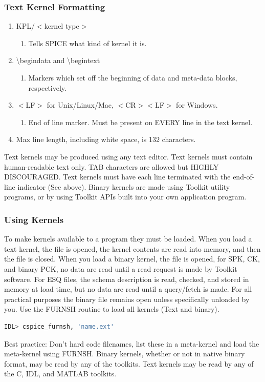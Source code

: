\documentclass[crop=false,class=book]{standalone}
\begin{document}
            \subsubsection*{Text Kernel Formatting}
            \begin{enumerate}
                \item[]KPL/$<$kernel type$>$
                \begin{enumerate}
                    \item[] Tells SPICE what kind of kernel it is.
                \end{enumerate}
                \item[] \textbackslash begindata and \textbackslash begintext
                \begin{enumerate}
                    \item[] Markers which set off the beginning of data and meta-data blocks, respectively.
                \end{enumerate}
                \item[] $<$LF$>$ for Unix/Linux/Mac, $<$CR$><$LF$>$ for Windows.
                \begin{enumerate}
                    \item[] End of line marker. Must be present on EVERY line in the text kernel.
                \end{enumerate}
                \item[] Max line length, including white space, is 132 characters.
            \end{enumerate}
            Text kernels may be produced using any text editor. Text kernels must contain human-readable text only. TAB characters are allowed but HIGHLY DISCOURAGED. Text kernels must have each line terminated with the end-of-line indicator (See above). Binary kernels are made using Toolkit utility programs, or by using Toolkit APIs built into your own application program.
            \subsubsection{Using Kernels}
            To make kernels available to a program they must be loaded. When you load a text kernel, the file is opened, the kernel contents are read into memory, and then the file is closed. When you load a binary kernel, the file is opened, for SPK, CK, and binary PCK, no data are read until a read request is made by Toolkit software. For ESQ files, the schema description is read, checked, and stored in memory at load time, but no data are read until a query/fetch is made. For all practical purposes the binary file remains open unless specifically unloaded by you. Use the FURNSH routine to load all kernels (Text and binary).
            \begin{lstlisting}[language=bash,basicstyle=\footnotesize]
            IDL> cspice_furnsh, 'name.ext'
            \end{lstlisting}
            Best practice: Don't hard code filenames, list these in a meta-kernel and load the meta-kernel using FURNSH. Binary kernels, whether or not in native binary format, may be read by any of the toolkits. Text kernels may be read by any of the C, IDL, and MATLAB toolkits.
\end{document}
